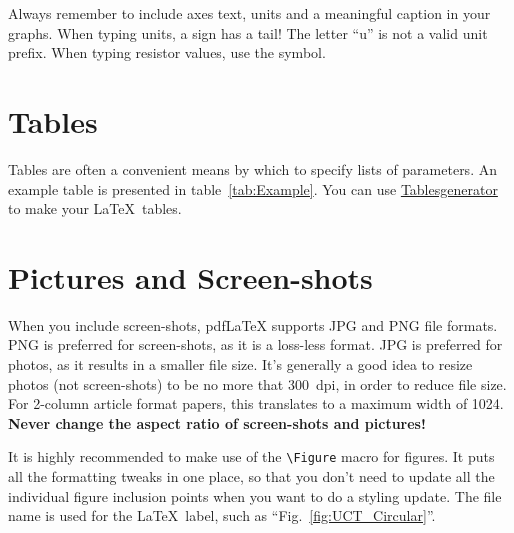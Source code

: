 
Always remember to include axes text, units and a meaningful caption in your graphs.  When typing units, a \micro{} sign has a tail!  The letter ``u'' is not a valid unit prefix.  When typing resistor values, use the \ohm{} symbol.

\section{Tables}

Tables are often a convenient means by which to specify lists of parameters.  An example table is presented in table~\ref{tab:Example}. You can use \href{https://www.tablesgenerator.com/}{Tablesgenerator} to make your \LaTeX\ tables.


\section{Pictures and Screen-shots}

When you include screen-shots, pdf\LaTeX{} supports JPG and PNG file formats.  PNG is preferred for screen-shots, as it is a loss-less format.  JPG is preferred for photos, as it results in a smaller file size.  It's generally a good idea to resize photos (not screen-shots) to be no more that 300~dpi, in order to reduce file size.  For 2-column article format papers, this translates to a maximum width of 1024.  \textbf{Never change the aspect ratio of screen-shots and pictures!}

It is highly recommended to make use of the \verb|\Figure| macro for figures.  It puts all the formatting tweaks in one place, so that you don't need to update all the individual figure inclusion points when you want to do a styling update.  The file name is used for the \LaTeX\ label, such as ``Fig.~\ref{fig:UCT_Circular}''.

